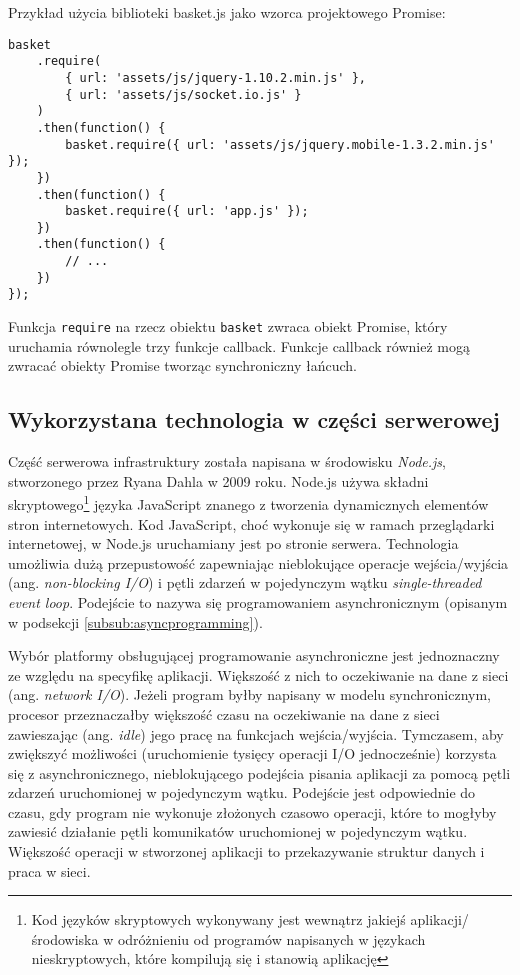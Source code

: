 Przykład użycia biblioteki basket.js jako wzorca projektowego Promise:

\lstset{language=JavaScript}
\begin{lstlisting}
basket
    .require(
		{ url: 'assets/js/jquery-1.10.2.min.js' },
		{ url: 'assets/js/socket.io.js' }
	)
    .then(function() {
        basket.require({ url: 'assets/js/jquery.mobile-1.3.2.min.js' });
    })
	.then(function() {
        basket.require({ url: 'app.js' });
    })
	.then(function() {
	 	// ...
	})
});
\end{lstlisting}

Funkcja \lstinline{require} na rzecz obiektu \lstinline{basket} zwraca obiekt Promise, który uruchamia równolegle trzy funkcje callback. Funkcje callback również mogą zwracać obiekty Promise tworząc synchroniczny łańcuch.

\subsection{Wykorzystana technologia w części serwerowej}
\label{sub:tool-server-technology}

Część serwerowa infrastruktury została napisana w środowisku \emph{Node.js}, stworzonego przez Ryana Dahla w 2009 roku. Node.js używa składni skryptowego\footnote{Kod języków skryptowych wykonywany jest wewnątrz jakiejś aplikacji/środowiska w odróżnieniu od programów napisanych w językach nieskryptowych, które kompilują się i stanowią aplikację} języka JavaScript znanego z tworzenia dynamicznych elementów stron internetowych. Kod JavaScript, choć wykonuje się w ramach przeglądarki internetowej, w Node.js uruchamiany jest po stronie serwera. Technologia umożliwia dużą przepustowość zapewniając nieblokujące operacje wejścia/wyjścia (ang. \emph{non-blocking I/O}) i pętli zdarzeń w pojedynczym wątku \emph{single-threaded event loop}. Podejście to nazywa się programowaniem asynchronicznym (opisanym w podsekcji \ref{subsub:asyncprogramming}).

Wybór platformy obsługującej programowanie asynchroniczne jest jednoznaczny ze względu na specyfikę aplikacji. Większość z nich to oczekiwanie na dane z sieci (ang. \emph{network I/O}). Jeżeli program byłby napisany w modelu synchronicznym, procesor przeznaczałby większość czasu na oczekiwanie na dane z sieci zawieszając (ang. \emph{idle}) jego pracę na funkcjach wejścia/wyjścia. Tymczasem, aby zwiększyć możliwości (uruchomienie tysięcy operacji I/O jednocześnie) korzysta się z asynchronicznego, nieblokującego podejścia pisania aplikacji za pomocą pętli zdarzeń uruchomionej w pojedynczym wątku. Podejście jest odpowiednie do czasu, gdy program nie wykonuje złożonych czasowo operacji, które to mogłyby zawiesić działanie pętli komunikatów uruchomionej w pojedynczym wątku. Większość operacji w stworzonej aplikacji to przekazywanie struktur danych i praca w sieci.

